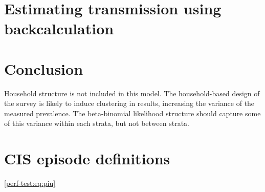 \documentclass{cam-thesis}
\makeatletter
\DeclareRobustCommand\onedot{\futurelet\@let@token\@onedot}
\def\@onedot{\ifx\@let@token.\else.\null\fi\xspace}
\def\ie{i.e\onedot} \def\Ie{\emph{I.e}\onedot}
\DeclareMathOperator{\prob}{\mathbb{P}}
\makeatother
\begin{document}








\chapter{Estimating transmission using backcalculation} \label{backcalc}



\chapter{Conclusion}
Household structure is not included in this model.
The household-based design of the survey is likely to induce clustering in results, increasing the variance of the measured prevalence.
The beta-binomial likelihood structure should capture some of this variance within each strata, but not between strata.

\listoftodos

\printbibliography

\appendix



\chapter{CIS episode definitions} \label{episode-def}




\cref{perf-test:eq:piu}
\end{document}
